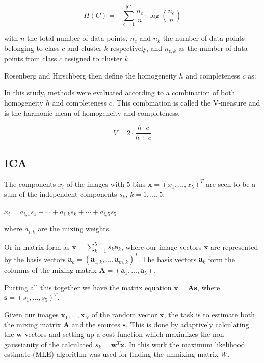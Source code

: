 \documentclass[a4paper,11pt]{article}
\begin{document}
\begin{equation}
H(C) = - \sum_{c=1}^{|C|} \frac{n_c}{n} \cdot \log\left(\frac{n_c}{n}\right)
\end{equation}

with $n$ the total number of data points, $n_c$ and $n_k$ the number of data points belonging to class $c$ and cluster $k$ respectively, and $n_{c,k}$ as the number of data points from class $c$ assigned to cluster $k$.

Rosenberg and Hirschberg then define the homogeneity $h$ and completeness $c$ as:

    



In this study, methods were evaluated according to a combination of both homogeneity $h$ and completeness $c$. This combination is called the V-measure and is the harmonic mean of homogeneity and completeness.

\begin{equation}
V = 2 \cdot \frac{h \cdot c}{h + c}
\end{equation}

\subsection{ICA}

The components $x_i$ of the images with 5 bins $\boldsymbol{x}=(x_1,\ldots,x_5)^T$ are seen to be a sum of the independent components $s_k$, $k=1,\ldots,5$:

$x_i = a_{i,1} s_1 + \cdots + a_{i,k} s_k + \cdots + a_{i,5} s_5$

where $a_{i,k}$ are the mixing weights.

Or in matrix form as $\boldsymbol{x}=\sum_{k=1}^{5} s_k \boldsymbol{a}_k$, where our image vectors $\boldsymbol{x}$ are represented by the basis vectors $\boldsymbol{a}_k=(\boldsymbol{a}_{1,k},\ldots,\boldsymbol{a}_{m,k})^T$. The basis vectors $\boldsymbol{a}_k$ form the columns of the mixing matrix $\boldsymbol{A}=(\boldsymbol{a}_1,\ldots,\boldsymbol{a}_5)$.

Putting all this together we have the matrix equation $\boldsymbol{x}=\boldsymbol{A} \boldsymbol{s}$, where $\boldsymbol{s}=(s_1,\ldots,s_5)^T$.

Given our images $\boldsymbol{x}_1,\ldots,\boldsymbol{x}_N$ of the random vector $\boldsymbol{x}$, the task is to estimate both the mixing matrix $\boldsymbol{A}$ and the sources $\boldsymbol{s}$. This is done by adaptively calculating the $\boldsymbol{w}$ vectors and setting up a cost function which maximizes the non-gaussianity of the calculated $s_k = \boldsymbol{w}^T \boldsymbol{x}$. In this work 
the maximum likelihood estimate (MLE) algorithm was used for finding the unmixing matrix $W$. 









\vfill









\end{document}
